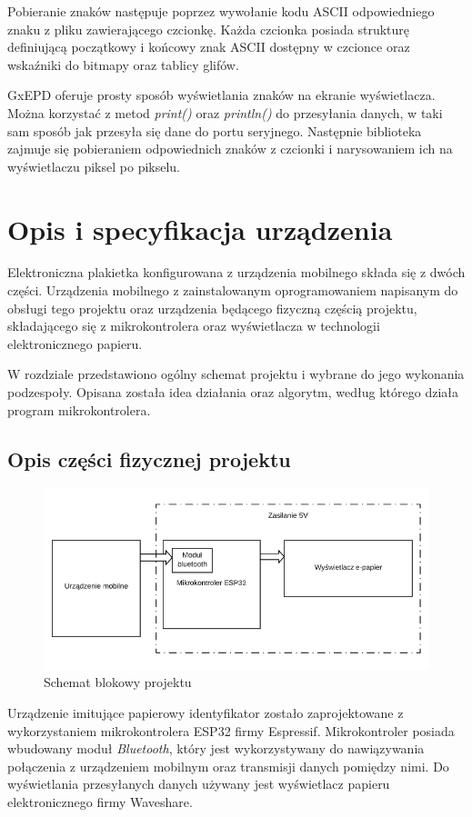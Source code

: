 \documentclass[a4paper,12pt, twoside]{article}
\begin{document}
        Pobieranie znaków następuje poprzez wywołanie kodu ASCII odpowiedniego znaku z pliku zawierającego czcionkę. Każda czcionka posiada strukturę definiującą początkowy i końcowy znak ASCII dostępny w czcionce oraz wskaźniki do bitmapy oraz tablicy glifów.
        
        GxEPD oferuje prosty sposób wyświetlania znaków na ekranie wyświetlacza. Można korzystać z metod \textit{print()} oraz \textit{println()} do przesyłania danych, w taki sam sposób jak przesyła się dane do portu seryjnego. Następnie biblioteka zajmuje się pobieraniem odpowiednich znaków z czcionki i narysowaniem ich na wyświetlaczu piksel po pikselu. 
        
    	\section{Opis i specyfikacja urządzenia}
    	Elektroniczna plakietka konfigurowana z urządzenia mobilnego składa się z dwóch części. Urządzenia mobilnego z zainstalowanym oprogramowaniem napisanym do obsługi tego projektu oraz urządzenia będącego fizyczną częścią projektu, składającego się z mikrokontrolera oraz wyświetlacza w technologii elektronicznego papieru.
    
        W rozdziale przedstawiono ogólny schemat projektu i wybrane do jego wykonania podzespoły. Opisana została idea działania oraz algorytm, według którego działa program mikrokontrolera.
        
        \subsection{Opis części fizycznej projektu}
        \begin{figure}[H]
    	        \centering
    			\includegraphics[width=12cm]{images/rys_7schemat_blokowy.png}
    			\caption{Schemat blokowy projektu}
                \label{fig:block}
    	\end{figure}
        Urządzenie imitujące papierowy identyfikator zostało zaprojektowane z wykorzystaniem mikrokontrolera ESP32 firmy Espressif. Mikrokontroler posiada wbudowany moduł \textit{Bluetooth}, który jest wykorzystywany do nawiązywania połączenia z urządzeniem mobilnym oraz transmisji danych pomiędzy nimi. Do wyświetlania przesyłanych danych używany jest wyświetlacz papieru elektronicznego firmy Waveshare.
        
\end{document}
